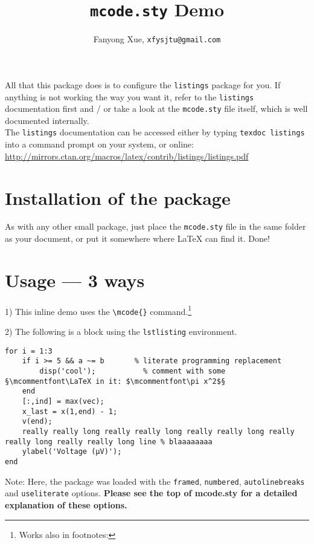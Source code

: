 \documentclass{article}
\title{\texttt{mcode.sty} Demo}
\author{Fanyong Xue, \texttt{xfysjtu@gmail.com}}
\begin{document}
\maketitle

\begin{center}
\begin{minipage}{.75\linewidth}

	All that this package does is to configure the \verb|listings| package for you. If anything is not working the way you want it, refer to the \verb|listings| documentation first and / or take a look at the \verb|mcode.sty| file itself, which is well documented internally.\\
	
	The \verb|listings| documentation can be accessed either by typing \verb|texdoc listings| into a command prompt on your system, or online:\\\scriptsize\url{http://mirrors.ctan.org/macros/latex/contrib/listings/listings.pdf}
	
\end{minipage}
\end{center}

\section*{Installation of the package}

As with any other small package, just place the \verb|mcode.sty| file in the same folder as your document, or put it somewhere where \LaTeX{} can find it.  Done!

\medskip

\section*{Usage --- 3 ways}

1) This inline demo  uses the \verb|\mcode{}| command.\footnote{Works also in footnotes: }

2) The following is a block using the \verb|lstlisting| environment.
\begin{lstlisting}
for i = 1:3
	if i >= 5 && a ~= b       % literate programming replacement
		disp('cool');           % comment with some §\mcommentfont\LaTeX in it: $\mcommentfont\pi x^2$§
	end
	[:,ind] = max(vec);
	x_last = x(1,end) - 1;
	v(end);
	really really long really really long really really long really really long really really long line % blaaaaaaaa
	ylabel('Voltage (µV)');
end
\end{lstlisting}
Note: Here, the package was loaded with the \verb|framed|, \verb|numbered|, \verb|autolinebreaks| and \verb|useliterate| options.  \textbf{Please see the top of mcode.sty for a detailed explanation of these options.}
\end{document}

